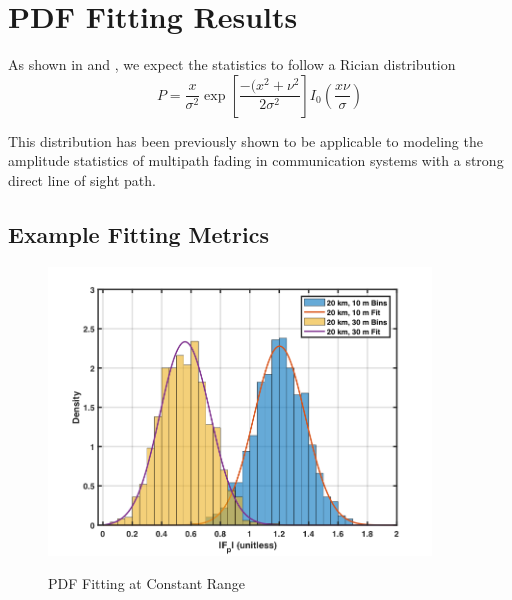 \section{PDF Fitting Results}
As shown in \cite{yeh_first_principles} and \cite{yeh_fading}, we expect the statistics to follow a Rician distribution
\begin{equation}
P = \frac{x}{\sigma^2}\exp\left[\frac{-(x^2 + \nu^2}{2\sigma^2} \right]I_0\left(\frac{x\nu}{\sigma} \right)
\label{stat_eq:5}
\end{equation}
\renewcommand{\baselinestretch}{2} \small\normalsize

This distribution has been previously shown to be applicable to modeling the amplitude statistics of multipath fading in communication systems with a strong direct line of sight path.

\subsection{Example Fitting Metrics}
\begin{figure}[H]
  \begin{center}
\includegraphics[width=4in]{../media/statistics/constant_range_fit.png}
  \end{center}
  \renewcommand{\baselinestretch}{1} \small\normalsize
  \begin{quote}
    \caption[PDF Fitting at Constant Range]{PDF Fitting at Constant Range\label{stat_fig:4}}
  \end{quote}
\end{figure}
\renewcommand{\baselinestretch}{2} \small\normalsize

